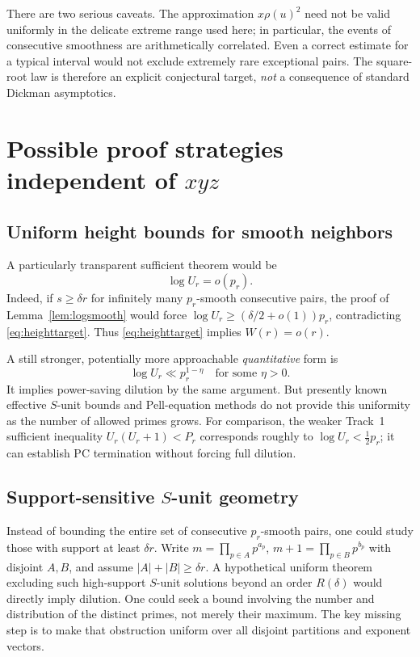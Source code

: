 \documentclass[11pt,letterpaper]{article}
\theoremstyle{remark}
\begin{document}
There are two serious caveats. The approximation $x\rho(u)^2$
need not be valid uniformly in the delicate extreme range used
here; in particular, the events of consecutive smoothness are
arithmetically correlated. Even a correct estimate for a typical
interval would not exclude extremely rare exceptional pairs.
The square-root law is therefore an explicit conjectural target,
\emph{not} a consequence of standard Dickman asymptotics.

\section{Possible proof strategies independent of $xyz$}
\subsection{Uniform height bounds for smooth neighbors}
A particularly transparent sufficient theorem would be
\begin{equation}\label{eq:heighttarget}
 \boxed{\log U_r=o(p_r).}
\end{equation}
Indeed, if $s\ge\delta r$ for infinitely many $p_r$-smooth
consecutive pairs, the proof of Lemma~\ref{lem:logsmooth} would force
$\log U_r\ge(\delta/2+o(1))p_r$, contradicting
\eqref{eq:heighttarget}. Thus \eqref{eq:heighttarget} implies
$W(r)=o(r)$.

A still stronger, potentially more approachable \emph{quantitative}
form is
\[
\log U_r\ll p_r^{1-\eta}\quad\text{for some }\eta>0.
\]
It implies power-saving dilution by the same argument.
But presently known effective $S$-unit bounds and Pell-equation
methods do not provide this uniformity as the number of allowed
primes grows. For comparison, the weaker Track~1 sufficient
inequality $U_r(U_r+1)<P_r$ corresponds roughly to
$\log U_r<\tfrac12p_r$; it can establish PC termination without
forcing full dilution.

\subsection{Support-sensitive $S$-unit geometry}
Instead of bounding the entire set of consecutive $p_r$-smooth pairs,
one could study those with support at least $\delta r$.
Write $m=\prod_{p\in A}p^{a_p}$,
$m+1=\prod_{p\in B}p^{b_p}$ with disjoint $A,B$, and assume
$|A|+|B|\ge\delta r$. A hypothetical uniform theorem excluding
such high-support $S$-unit solutions beyond an order $R(\delta)$
would directly imply dilution. One could seek a bound involving
the number and distribution of the distinct primes, not merely
their maximum. The key missing step is to make that obstruction
uniform over all disjoint partitions and exponent vectors.
\end{document}
